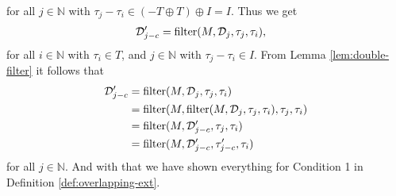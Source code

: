 for all $j \in \mathbb{N}$ with $\tau_j - \tau_i \in (-T \oplus T) \oplus I = I$.
Thus we get
\begin{align*}
    \mathcal{D}'_{j-c}
    & = \operatorname{filter}(M, \mathcal{D}_{j}, \tau_{j}, \tau_i), 
\end{align*}
for all $i \in \mathbb{N}$ with $\tau_i \in T$, and $j \in \mathbb{N}$ with $\tau_j - \tau_i \in I$.
From Lemma \ref{lem:double-filter} it follows that
\begin{align*}
    \mathcal{D}'_{j-c}
    &= \operatorname{filter}(M, \mathcal{D}_j, \tau_j, \tau_i) \\
    &= \operatorname{filter}(M, \operatorname{filter}(M, \mathcal{D}_j, \tau_j, \tau_i), \tau_j, \tau_i) \\
    &= \operatorname{filter}(M, \mathcal{D}'_{j-c}, \tau_j, \tau_i) \\
    &= \operatorname{filter}(M, \mathcal{D}'_{j-c}, \tau'_{j-c}, \tau_i) \\
\end{align*}
for all $j \in \mathbb{N}$.
And with that we have shown everything for Condition 1 in Definition \ref{def:overlapping-ext}.

